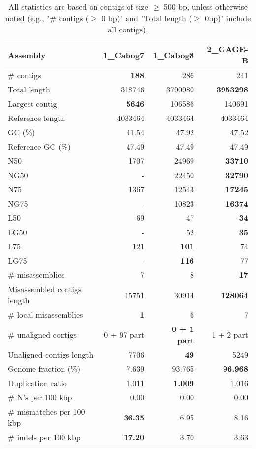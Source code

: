 \documentclass[12pt,a4paper]{article}
\begin{document}
\begin{table}[ht]
\begin{center}
\caption{All statistics are based on contigs of size $\geq$ 500 bp, unless otherwise noted (e.g., "\# contigs ($\geq$ 0 bp)" and "Total length ($\geq$ 0bp)" include all contigs).}
\begin{tabular}{|l*{3}{|r}|}
\hline
Assembly & 1\_Cabog7 & 1\_Cabog8 & 2\_GAGE-B \\ \hline
\# contigs & {\bf 188} & 286 & 241 \\ \hline
Total length & 318746 & 3790980 & {\bf 3953298} \\ \hline
Largest contig & {\bf 5646} & 106586 & 140691 \\ \hline
Reference length & 4033464 & 4033464 & 4033464 \\ \hline
GC (\%) & 41.54 & 47.92 & 47.52 \\ \hline
Reference GC (\%) & 47.49 & 47.49 & 47.49 \\ \hline
N50 & 1707 & 24969 & {\bf 33710} \\ \hline
NG50 & - & 22450 & {\bf 32790} \\ \hline
N75 & 1367 & 12543 & {\bf 17245} \\ \hline
NG75 & - & 10823 & {\bf 16374} \\ \hline
L50 & 69 & 47 & {\bf 34} \\ \hline
LG50 & - & 52 & {\bf 35} \\ \hline
L75 & 121 & {\bf 101} & 74 \\ \hline
LG75 & - & {\bf 116} & 77 \\ \hline
\# misassemblies & 7 & 8 & {\bf 17} \\ \hline
Misassembled contigs length & 15751 & 30914 & {\bf 128064} \\ \hline
\# local misassemblies & {\bf 1} & 6 & 7 \\ \hline
\# unaligned contigs & 0 + 97 part & {\bf 0 + 1 part} & 1 + 2 part \\ \hline
Unaligned contigs length & 7706 & {\bf 49} & 5249 \\ \hline
Genome fraction (\%) & 7.639 & 93.765 & {\bf 96.968} \\ \hline
Duplication ratio & 1.011 & {\bf 1.009} & 1.016 \\ \hline
\# N's per 100 kbp & 0.00 & 0.00 & 0.00 \\ \hline
\# mismatches per 100 kbp & {\bf 36.35} & 6.95 & 8.16 \\ \hline
\# indels per 100 kbp & {\bf 17.20} & 3.70 & 3.63 \\ \hline

\end{tabular}
\end{center}
\end{table}
\end{document}
